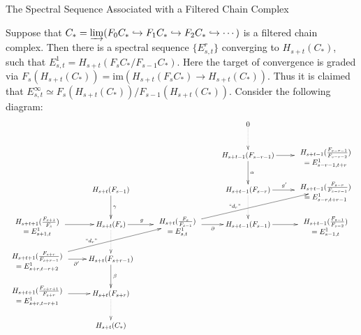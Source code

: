 \documentclass[11pt]{article}
\newcommand{\im}{\mbox{im}}
\theoremstyle{plain}
\theoremstyle{definition}
\renewcommand{\to}{\longrightarrow}
\newcommand{\myheading}[1]%
{{\noindent\Large #1}

}
\newcommand{\theexp}[4]{\raisebox{-.1cm}[.5cm][0cm]{\mbox{$\begin{array}{c}H_{#1}(\frac{F_{#2}}{F_{#3}}) \\=E^1_{#4} \end{array}$}}}%
\begin{document}
\myheading{The Spectral Sequence Associated with a Filtered Chain Complex}


Suppose that $C_*=\varinjlim(F_0C_*\hookrightarrow F_1C_*\hookrightarrow F_2C_*\hookrightarrow\cdots)$ is a filtered chain complex. Then there is a spectral sequence $\{E^r_{s,t}\}$ converging to $H_{s+t}(C_*)$, such that $E^1_{s,t}=H_{s+t}(F_sC_*/F_{s-1}C_*)$. Here the target of convergence is graded via $F_s(H_{s+t}(C_*))=\im(H_{s+t}(F_sC_*)\to H_{s+t}(C_*))$. Thus it is claimed that $E^\infty_{s,t}\simeq F_s(H_{s+t}(C_*))/F_{s-1}(H_{s+t}(C_*))$. Consider the following diagram:
%
\[\xymatrix{
&&&0\ar@{.>}[d]&\\
&&&H_{s+t-1}(F_{s-r-1})\ar[d]^\alpha \ar[r]&\theexp{s+t-1}{s-r-1}{s-r-2}{s-r-1,t+r}\\
&H_{s+t}(F_{s-1})\ar[d]^\gamma&&H_{s+t-1}(F_{s-r})\ar@{.>}[d] \ar[r]^{g'\ \ }&\theexp{s+t-1}{s-r}{s-r-1}{s-r,t+r-1}\\
\theexp{s+t+1}{s+1}{s}{s+1,t}\ar[r]&H_{s+t}(F_s)\ar[r]^{g\ \ }\ar@{.>}[d]&
\theexp{s+t}{s}{s-1}{s,t}\ar[r]_\partial\ar[rru]^(.4){\text{``$d_r$''}}
&H_{s+t-1}(F_{s-1}) \ar[r]&\theexp{s+t-1}{s-1}{s-2}{s-1,t}\\
\theexp{s+t+1}{s+r}{s+r-1}{s+r,t-r+2}\ar[r]_{\ \ \partial'}\ar[rru]^(.4){\text{``$d_r$''}}&H_{s+t}(F_{s+r-1})\ar[d]^{\beta}\\
\theexp{s+t+1}{s+r+1}{s+r}{s+r,t-r+1}\ar[r]&H_{s+t}(F_{s+r})\ar@{.>}[d]\\
&H_{s+t}(C_*)
}\]
\end{document}
